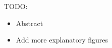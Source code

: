 \color{purple}
TODO:
\begin{itemize}
  \item Abstract
  \item Add more explanatory figures
\end{itemize}
